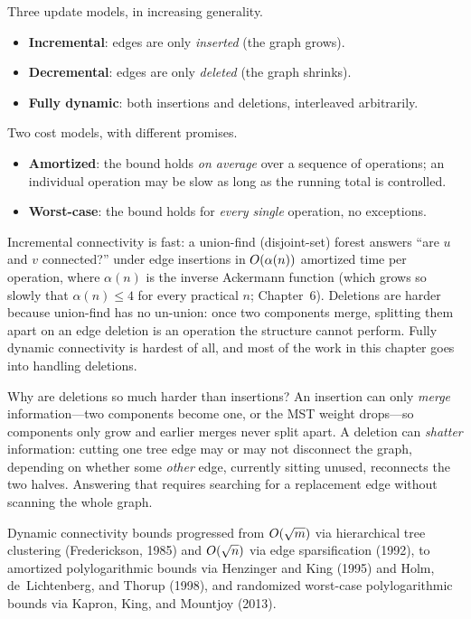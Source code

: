 \begin{focusbox}
Three update models, in increasing generality.
\begin{itemize}
  \item \textbf{Incremental}: edges are only \emph{inserted} (the graph grows).
  \item \textbf{Decremental}: edges are only \emph{deleted} (the graph shrinks).
  \item \textbf{Fully dynamic}: both insertions and deletions, interleaved
        arbitrarily.
\end{itemize}
Two cost models, with different promises.
\begin{itemize}
  \item \textbf{Amortized}: the bound holds \emph{on average} over a sequence of
        operations; an individual operation may be slow as long as the running
        total is controlled.
  \item \textbf{Worst-case}: the bound holds for \emph{every single} operation,
        no exceptions.
\end{itemize}
\end{focusbox}

Incremental connectivity is fast: a union-find (disjoint-set) forest answers
``are $u$ and $v$ connected?'' under edge insertions in $O(\alpha(n))$ amortized
time per operation, where $\alpha(n)$ is the inverse Ackermann function (which grows
so slowly that $\alpha(n)\le 4$ for every practical $n$; Chapter~6). Deletions are
harder because union-find has no un-union: once two components merge, splitting them
apart on an edge deletion is an operation the structure cannot perform. Fully dynamic
connectivity is hardest of all, and most of the work in this chapter goes into handling
deletions.

\begin{intuitionbox}
Why are deletions so much harder than insertions? An insertion can only
\emph{merge} information---two components become one, or the MST weight drops---so
components only grow and earlier merges never split apart. A deletion can
\emph{shatter} information: cutting one tree edge may or may not disconnect the
graph, depending on whether some \emph{other} edge, currently sitting unused,
reconnects the two halves. Answering that requires searching for a replacement
edge without scanning the whole graph.
\end{intuitionbox}

\begin{marginnotebox}
Dynamic connectivity bounds progressed from $O(\sqrt{m})$ via hierarchical tree clustering (Frederickson, 1985) and $O(\sqrt{n})$ via edge sparsification (1992), to amortized polylogarithmic bounds via Henzinger and King (1995) and Holm, de~Lichtenberg, and Thorup (1998), and randomized worst-case polylogarithmic bounds via Kapron, King, and Mountjoy (2013).
\end{marginnotebox}

